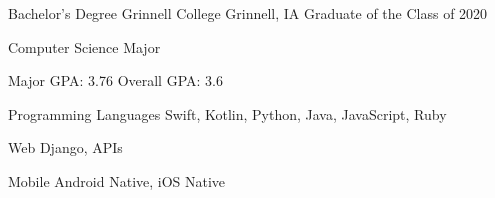 \documentclass[12pt, a4paper]{awesome-cv}
\begin{document}
\begin{cventries}


\end{cventries}


\begin{cventries}
  \cventry
    {Bachelor's Degree}
    {Grinnell College}
    {Grinnell, IA}
    {Graduate of the Class of 2020}
    {
      \begin{cvitems}
        \item {Computer Science Major}
        \item {Major GPA: 3.76 \quad Overall GPA: 3.6}
      \end{cvitems}
    }
\end{cventries}


\begin{cvskills}
  \cvskill
    {Programming Languages} 
    {Swift, Kotlin, Python, Java, JavaScript, Ruby} 

  \cvskill
    {Web}
    {Django, APIs}

  \cvskill
    {Mobile}
    {Android Native, iOS Native}

\end{cvskills}


%
%
\end{document}
